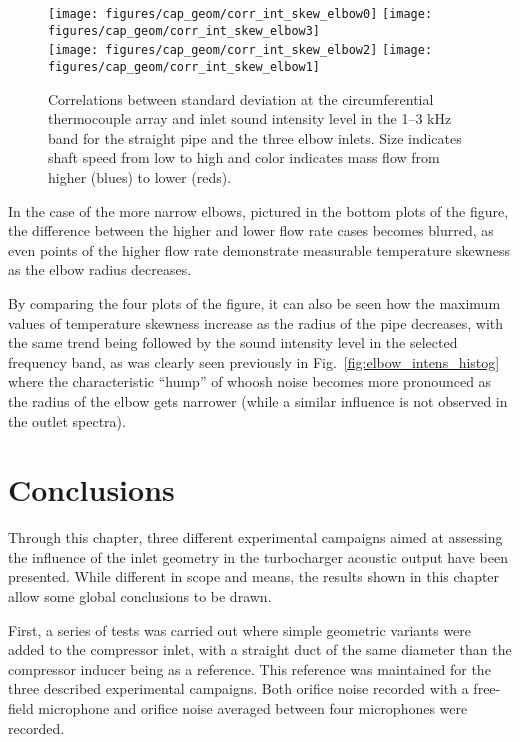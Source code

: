 \begin{figure}[t!]
\centering
\texttt{[image: figures/cap\_geom/corr\_int\_skew\_elbow0]}\hspace{4mm}
\texttt{[image: figures/cap\_geom/corr\_int\_skew\_elbow3]}\\[4mm]
\texttt{[image: figures/cap\_geom/corr\_int\_skew\_elbow2]}\hspace{4mm}
\texttt{[image: figures/cap\_geom/corr\_int\_skew\_elbow1]}
\caption{Correlations between standard deviation at the circumferential thermocouple array and inlet sound intensity level in the 1--3 kHz band for the straight pipe and the three elbow inlets. Size indicates shaft speed from low to high and color indicates mass flow from higher (blues) to lower (reds).}
\label{fig:comp_corrs_skew_sil}
\end{figure}

In the case of the more narrow elbows, pictured in the bottom plots of the figure, the difference between the higher and lower flow rate cases becomes blurred, as even points of the higher flow rate demonstrate measurable temperature skewness as the elbow radius decreases. 

By comparing the four plots of the figure, it can also be seen how the maximum values of temperature skewness increase as the radius of the pipe decreases, with the same trend being followed by the sound intensity level in the selected frequency band, as was clearly seen previously in Fig.~\ref{fig:elbow_intens_histog} where the characteristic ``hump'' of whoosh noise becomes more pronounced as the radius of the elbow gets narrower (while a similar influence is not observed in the outlet spectra).

\section{Conclusions}

Through this chapter, three different experimental campaigns aimed at assessing the influence of the inlet geometry in the turbocharger acoustic output have been presented. While different in scope and means, the results shown in this chapter allow some global conclusions to be drawn.

First, a series of tests was carried out where simple geometric variants were added to the compressor inlet, with a straight duct of the same diameter than the compressor inducer being as a reference. This reference was maintained for the three described experimental campaigns. Both orifice noise recorded with a free-field microphone and orifice noise averaged between four microphones were recorded.

